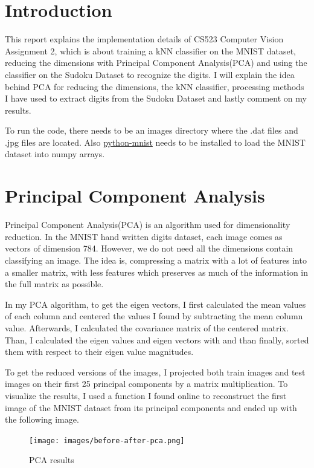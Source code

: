 \section*{Introduction}

This report explains the implementation details of CS523 Computer Vision
Assignment 2, which is about training a kNN classifier on the MNIST dataset,
reducing the dimensions with Principal Component Analysis(PCA) and using the
classifier on the Sudoku Dataset to recognize the digits. I will explain the
idea behind PCA for reducing the dimensions, the kNN classifier, processing
methods I have used to extract digits from the Sudoku Dataset and lastly comment
on my results.

To run the code, there needs to be an images directory where the .dat files and
.jpg files are located. Also
\href{https://pypi.org/project/python-mnist/} {python-mnist} needs to be
installed to load the MNIST dataset into numpy arrays.


\section*{Principal Component Analysis}

Principal Component Analysis(PCA) is an algorithm used for dimensionality
reduction. In the MNIST hand written digits dataset, each image comes as vectors
of dimension 784. However, we do not need all the dimensions contain classifying
an image.  The idea is, compressing a matrix with a lot of features into a
smaller matrix, with less features which preserves as much of the information in
the full matrix as possible.

In my PCA algorithm, to get the eigen vectors, I first calculated the mean
values of each column and centered the values I found by subtracting the mean
column value. Afterwards, I calculated the covariance matrix of the centered
matrix. Than, I calculated the eigen values and eigen vectors with and than
finally, sorted them with respect to their eigen value magnitudes.

To get the reduced versions of the images, I projected both train images and
test images on their first 25 principal components by a matrix multiplication.
To visualize the results, I used a function I found online to reconstruct the
first image of the MNIST dataset from its principal components and ended up with
the following image.

\begin{figure}[H] \centering
    \texttt{[image: images/before-after-pca.png]}
    \caption*{PCA results} \setlength{\belowcaptionskip}{-40pt}
    \setlength{\abovecaptionskip}{-40pt}
\end{figure}

